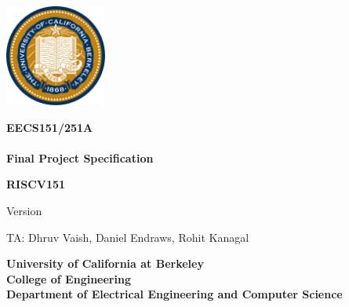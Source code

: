 \hypersetup{pageanchor=false}
\thispagestyle{empty}

\begin{center}
\includegraphics[width=0.25\textwidth]{figs/Seal_of_University_of_California_Berkeley.png}
\end{center}
\begin{center}
\LARGE{
\color{gray}
\bf EECS151/251A \\
\currentSemester \\
Final Project Specification \\
}
\end{center}

\vfill

\begin{center}
\Huge{
\color{berkeleyblue}
\bf RISCV151 \\
}
\end{center}

\vfill

\begin{center}
\LARGE{
\color{gray}
Version \projectSpecVersion \\
}
\end{center}

\vspace{3mm}

\begin{center}
\large{
TA: Dhruv Vaish, Daniel Endraws, Rohit Kanagal 
}
\end{center}
\begin{center}
\large{
\bf University of California at Berkeley \\
College of Engineering \\
Department of Electrical Engineering and Computer Science \\
}
\end{center}

\newpage
\hypersetup{pageanchor=true}
